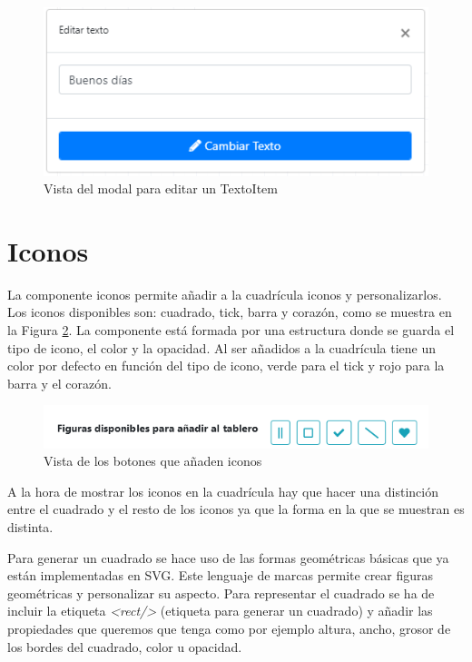 \begin{figure}[h!]
	\centering
	\includegraphics[width=0.7\linewidth]{Imagenes/Bitmap/modalEditarTexto}
	\caption{Vista del modal para editar un TextoItem}
	\label{fig:modaleditartexto}
\end{figure}



\section{Iconos}

La componente iconos permite añadir a la cuadrícula iconos y personalizarlos. Los iconos disponibles son: cuadrado, tick, barra y corazón, como se muestra en la Figura \ref{fig:herramientaitems}. La componente está formada por una estructura donde se guarda el tipo de icono, el color y la opacidad. Al ser añadidos a la cuadrícula tiene un color por defecto en función del tipo de icono, verde para el tick y rojo para la barra y el corazón.

\begin{figure}[h!]
	\centering
	\includegraphics[width=0.7\linewidth]{Imagenes/Bitmap/herramientaItems}
	\caption{Vista de los botones que añaden iconos}
	\label{fig:herramientaitems}
\end{figure}


A la hora de mostrar los iconos en la cuadrícula hay que hacer una distinción entre el cuadrado y el resto de los iconos ya que la forma en la que se muestran es distinta.

Para generar un cuadrado se hace uso de las formas geométricas básicas que ya están implementadas en SVG. Este lenguaje de marcas permite crear figuras geométricas y personalizar su aspecto. Para representar el cuadrado se ha de incluir la etiqueta \textit{<rect/>} (etiqueta para generar un cuadrado) y añadir las propiedades que queremos que tenga como por ejemplo altura, ancho, grosor de los bordes del cuadrado, color u opacidad.

